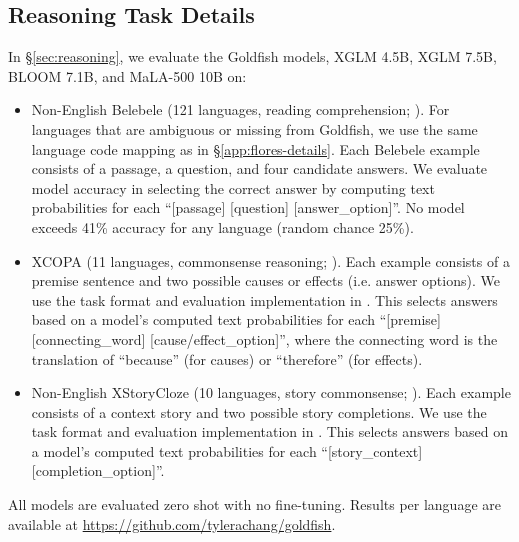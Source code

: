 \documentclass[11pt]{article}
\begin{document}
\subsection{Reasoning Task Details}
\label{app:reasoning-tasks}
In \S\ref{sec:reasoning}, we evaluate the Goldfish models, XGLM 4.5B, XGLM 7.5B, BLOOM 7.1B, and \mbox{MaLA-500} 10B on:
\begin{itemize}[leftmargin=0.5cm,itemsep=0.0cm,topsep=0.1cm]
\item Non-English Belebele (121 languages, reading comprehension; \citealp{bandarkar2024belebele}).
For languages that are ambiguous or missing from Goldfish, we use the same language code mapping as in \S\ref{app:flores-details}.
Each Belebele example consists of a passage, a question, and four candidate answers.
We evaluate model accuracy in selecting the correct answer by computing text probabilities for each ``[passage] [question] [answer\_option]''.
No model exceeds 41\% accuracy for any language (random chance 25\%).
\item XCOPA (11 languages, commonsense reasoning; 
\citealp{ponti-etal-2020-xcopa}). 
Each example consists of a premise sentence and two possible causes or effects (i.e. answer options).
We use the task format and evaluation implementation in \citet{eval-harness}.
This selects answers based on a model's computed text probabilities for each ``[premise] [connecting\_word] [cause/effect\_option]'', where the connecting word is the translation of ``because'' (for causes) or ``therefore'' (for effects).
\item Non-English XStoryCloze (10 languages, story commonsense; \citealp{lin2022xglm}).
Each example consists of a context story and two possible story completions.
We use the task format and evaluation implementation in \citet{eval-harness}.
This selects answers based on a model's computed text probabilities for each ``[story\_context] [completion\_option]''.
\end{itemize}
All models are evaluated zero shot with no fine-tuning.
Results per language are available at \url{https://github.com/tylerachang/goldfish}.
\end{document}
